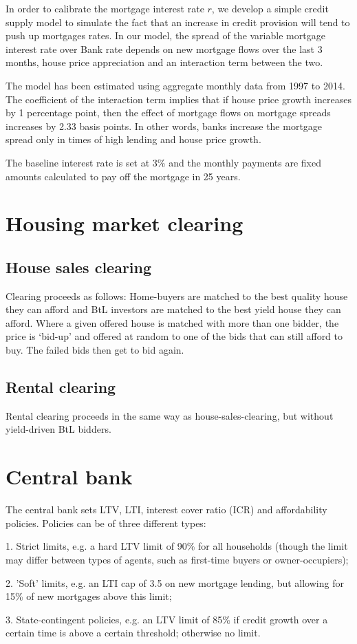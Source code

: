 \documentclass{article}
\begin{document}
\bigskip \bigskip

In order to calibrate the mortgage interest rate $r$, we develop a simple
credit supply model to simulate the fact that an increase in credit
provision will tend to push up mortgages rates. In our model, the spread of
the variable mortgage interest rate over Bank rate depends on new mortgage
flows over the last 3 months, house price appreciation and an interaction
term between the two.

The model has been estimated using aggregate monthly data from 1997 to 2014.
The coefficient of the interaction term implies that if house price growth
increases by 1 percentage point, then the effect of mortgage flows on
mortgage spreads increases by 2.33 basis points. In other words, banks
increase the mortgage spread only in times of high lending and house price
growth.

The baseline interest rate is set at 3\% and the monthly payments are fixed
amounts calculated to pay off the mortgage in 25 years.

\section{Housing market clearing}

\subsection{House sales clearing}

Clearing proceeds as follows: Home-buyers are matched to the best quality
house they can afford and BtL investors are matched to the best yield house
they can afford. Where a given offered house is matched with more than one
bidder, the price is `bid-up' and offered at random to one of the bids that
can still afford to buy. The failed bids then get to bid again.

\subsection{Rental clearing}

Rental clearing proceeds in the same way as house-sales-clearing, but
without yield-driven BtL bidders.\bigskip

\section{Central bank}

The central bank sets LTV, LTI, interest cover ratio (ICR) and affordability
policies. Policies can be of three different types:

1. Strict limits, e.g. a hard LTV limit of 90\% for all households (though
the limit may differ between types of agents, such as first-time buyers or
owner-occupiers);

2. 'Soft' limits, e.g. an LTI cap of 3.5 on new mortgage lending, but
allowing for 15\% of new mortgages above this limit;

3. State-contingent policies, e.g. an LTV limit of 85\% if credit growth
over a certain time is above a certain threshold; otherwise no limit.
\end{document}
